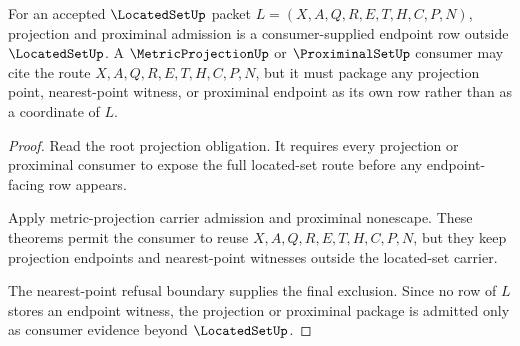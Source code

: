 \begin{theorem}
\label{thm:located-set-projection-proximinal-obligation-package}
For an accepted $\LocatedSetUp$ packet $L=(X,A,Q,R,E,T,H,C,P,N)$, projection and proximinal admission is a consumer-supplied endpoint row outside $\LocatedSetUp$. A $\MetricProjectionUp$ or $\ProximinalSetUp$ consumer may cite the route $X,A,Q,R,E,T,H,C,P,N$, but it must package any projection point, nearest-point witness, or proximinal endpoint as its own row rather than as a coordinate of $L$.
\end{theorem}
\begin{proof}
Read the root projection obligation. It requires every projection or proximinal consumer to expose the full located-set route before any endpoint-facing row appears.

Apply metric-projection carrier admission and proximinal nonescape. These theorems permit the consumer to reuse $X,A,Q,R,E,T,H,C,P,N$, but they keep projection endpoints and nearest-point witnesses outside the located-set carrier.

The nearest-point refusal boundary supplies the final exclusion. Since no row of $L$ stores an endpoint witness, the projection or proximinal package is admitted only as consumer evidence beyond $\LocatedSetUp$.
\end{proof}

